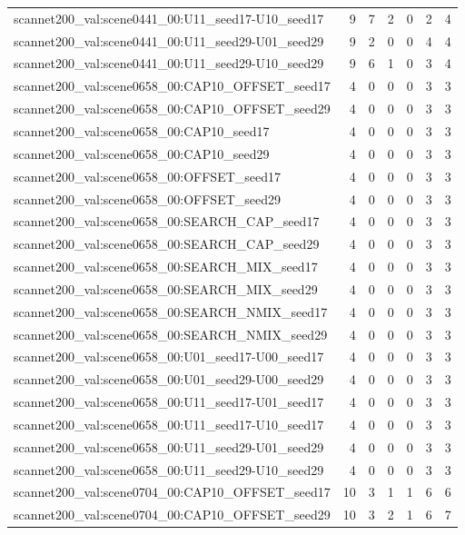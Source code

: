 \begin{table}[t]
\begin{tabular}{lrrrrrr}
scannet200\_val:scene0441\_00:U11\_seed17-U10\_seed17 & 9 & 7 & 2 & 0 & 2 & 4 \\
scannet200\_val:scene0441\_00:U11\_seed29-U01\_seed29 & 9 & 2 & 0 & 0 & 4 & 4 \\
scannet200\_val:scene0441\_00:U11\_seed29-U10\_seed29 & 9 & 6 & 1 & 0 & 3 & 4 \\
scannet200\_val:scene0658\_00:CAP10\_OFFSET\_seed17 & 4 & 0 & 0 & 0 & 3 & 3 \\
scannet200\_val:scene0658\_00:CAP10\_OFFSET\_seed29 & 4 & 0 & 0 & 0 & 3 & 3 \\
scannet200\_val:scene0658\_00:CAP10\_seed17 & 4 & 0 & 0 & 0 & 3 & 3 \\
scannet200\_val:scene0658\_00:CAP10\_seed29 & 4 & 0 & 0 & 0 & 3 & 3 \\
scannet200\_val:scene0658\_00:OFFSET\_seed17 & 4 & 0 & 0 & 0 & 3 & 3 \\
scannet200\_val:scene0658\_00:OFFSET\_seed29 & 4 & 0 & 0 & 0 & 3 & 3 \\
scannet200\_val:scene0658\_00:SEARCH\_CAP\_seed17 & 4 & 0 & 0 & 0 & 3 & 3 \\
scannet200\_val:scene0658\_00:SEARCH\_CAP\_seed29 & 4 & 0 & 0 & 0 & 3 & 3 \\
scannet200\_val:scene0658\_00:SEARCH\_MIX\_seed17 & 4 & 0 & 0 & 0 & 3 & 3 \\
scannet200\_val:scene0658\_00:SEARCH\_MIX\_seed29 & 4 & 0 & 0 & 0 & 3 & 3 \\
scannet200\_val:scene0658\_00:SEARCH\_NMIX\_seed17 & 4 & 0 & 0 & 0 & 3 & 3 \\
scannet200\_val:scene0658\_00:SEARCH\_NMIX\_seed29 & 4 & 0 & 0 & 0 & 3 & 3 \\
scannet200\_val:scene0658\_00:U01\_seed17-U00\_seed17 & 4 & 0 & 0 & 0 & 3 & 3 \\
scannet200\_val:scene0658\_00:U01\_seed29-U00\_seed29 & 4 & 0 & 0 & 0 & 3 & 3 \\
scannet200\_val:scene0658\_00:U11\_seed17-U01\_seed17 & 4 & 0 & 0 & 0 & 3 & 3 \\
scannet200\_val:scene0658\_00:U11\_seed17-U10\_seed17 & 4 & 0 & 0 & 0 & 3 & 3 \\
scannet200\_val:scene0658\_00:U11\_seed29-U01\_seed29 & 4 & 0 & 0 & 0 & 3 & 3 \\
scannet200\_val:scene0658\_00:U11\_seed29-U10\_seed29 & 4 & 0 & 0 & 0 & 3 & 3 \\
scannet200\_val:scene0704\_00:CAP10\_OFFSET\_seed17 & 10 & 3 & 1 & 1 & 6 & 6 \\
scannet200\_val:scene0704\_00:CAP10\_OFFSET\_seed29 & 10 & 3 & 2 & 1 & 6 & 7 \\

\end{tabular}
\end{table}

